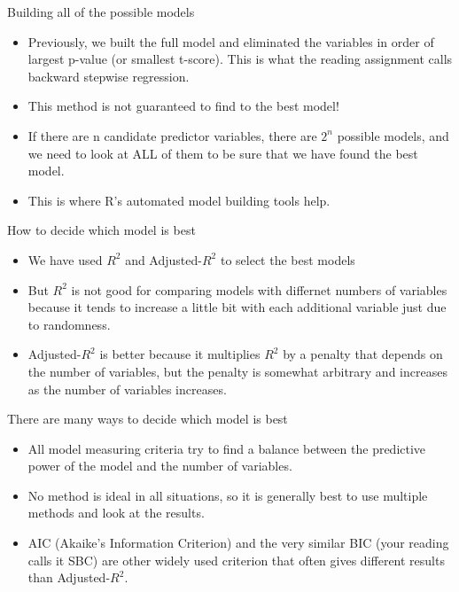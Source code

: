 \documentclass{beamer}\usepackage[]{graphicx}\usepackage[]{color}
\begin{document}
\begin{darkframes}
    \begin{frame}[fragile]{Building all of the possible models}
    \fontsize{8}{8}\selectfont
      \begin{itemize}[<+->]
        \item Previously, we built the full model and eliminated the variables in order of largest p-value (or smallest t-score). This is what the reading assignment calls backward stepwise regression.
        \item This method is not guaranteed to find to the best model!
        \item If there are n candidate predictor variables, there are $2^n$ possible models, and we need to look at ALL of them to be sure that we have found the best model.
        \item This is where R's automated model building tools help.
      \end{itemize} 
    \end{frame}

    \begin{frame}[fragile]{How to decide which model is best}
    \fontsize{8}{8}\selectfont
      \begin{itemize}[<+->]
        \item We have used $R^2$ and Adjusted-$R^2$ to select the best models
        \item But $R^2$ is not good for comparing models with differnet numbers of variables because it tends to increase a little bit with each additional variable just due to randomness.
        \item Adjusted-$R^2$ is better because it multiplies $R^2$ by a penalty that depends on the number of variables, but the penalty is somewhat arbitrary and increases as the number of variables increases.
      \end{itemize} 
    \end{frame}


    \begin{frame}[fragile]{There are many ways to decide which model is best}
    \fontsize{8}{8}\selectfont
      \begin{itemize}[<+->]
        \item All model measuring criteria try to find a balance between the predictive power of the model and the number of variables.
        \item No method is ideal in all situations, so it is generally best to use multiple methods and look at the results.
        \item AIC (Akaike’s Information Criterion) and the very similar BIC (your reading calls it SBC) are other widely used criterion that often gives different results than Adjusted-$R^2$.
      \end{itemize} 


\end{frame}
\end{darkframes}
\end{document}
